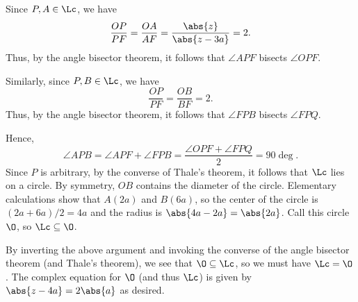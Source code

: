 \begin{solution}
\begin{ppart}
\begin{center}
        \end{center}

        Since $P, A \in \Lc$, we have \[\frac{OP}{PF} = \frac{OA}{AF} = \frac{\abs{z}}{\abs{z - 3a}} = 2.\] Thus, by the angle bisector theorem, it follows that $\angle APF$ bisects $\angle OPF$.

        Similarly, since $P, B \in \Lc$, we have \[\frac{OP}{PF} = \frac{OB}{BF} = 2.\] Thus, by the angle bisector theorem, it follows that $\angle FPB$ bisects $\angle FPQ$.

        Hence, \[\angle APB = \angle APF + \angle FPB = \frac{\angle OPF + \angle FPQ}{2} = 90\deg.\] Since $P$ is arbitrary, by the converse of Thale's theorem, it follows that $\Lc$ lies on a circle. By symmetry, $OB$ contains the diameter of the circle. Elementary calculations show that $A(2a)$ and $B(6a)$, so the center of the circle is $(2a + 6a)/2 = 4a$ and the radius is $\abs{4a - 2a} = \abs{2a}$. Call this circle $\O$, so $\Lc \subseteq \O$.

        By inverting the above argument and invoking the converse of the angle bisector theorem (and Thale's theorem), we see that $\O \subseteq\Lc$, so we must have $\Lc = \O$. The complex equation for $\O$ (and thus $\Lc$) is given by $\abs{z - 4a} = 2\abs{a}$ as desired.
    \end{ppart}


\end{solution}
